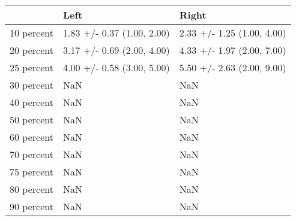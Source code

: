 \begin{tabular}{lll}
\toprule
{} &                        Left &                       Right \\
\midrule
10 percent &  1.83 +/- 0.37 (1.00, 2.00) &  2.33 +/- 1.25 (1.00, 4.00) \\
20 percent &  3.17 +/- 0.69 (2.00, 4.00) &  4.33 +/- 1.97 (2.00, 7.00) \\
25 percent &  4.00 +/- 0.58 (3.00, 5.00) &  5.50 +/- 2.63 (2.00, 9.00) \\
30 percent &                         NaN &                         NaN \\
40 percent &                         NaN &                         NaN \\
50 percent &                         NaN &                         NaN \\
60 percent &                         NaN &                         NaN \\
70 percent &                         NaN &                         NaN \\
75 percent &                         NaN &                         NaN \\
80 percent &                         NaN &                         NaN \\
90 percent &                         NaN &                         NaN \\
\bottomrule
\end{tabular}

